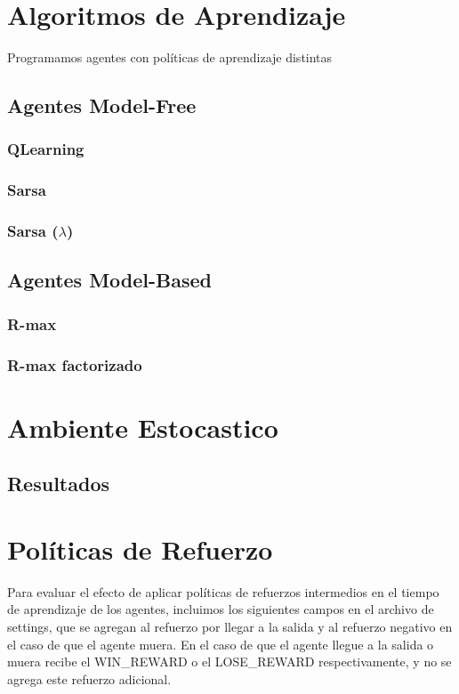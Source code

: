 \documentclass[a4paper,spanish] {article}
\begin{document}
\section{Algoritmos de Aprendizaje}
	Programamos agentes con pol\'iticas de aprendizaje distintas 
	\subsection{Agentes Model-Free}
		\subsubsection{QLearning}
		\subsubsection{Sarsa}
		\subsubsection{Sarsa ($\lambda$)}	
	\subsection{Agentes Model-Based}	
		\subsubsection{R-max}
		\subsubsection{R-max factorizado}

\section{Ambiente Estocastico}
	\subsection{Resultados}
	
 \section{Pol\'iticas de Refuerzo}
 	Para evaluar el efecto de aplicar pol\'iticas de refuerzos intermedios en el tiempo de aprendizaje de los agentes, incluimos los siguientes campos en el archivo de settings, que se agregan al refuerzo por llegar a la salida y al refuerzo negativo en el caso de que el agente muera. En el caso de que el agente llegue a la salida o muera recibe el WIN_REWARD o el LOSE_REWARD respectivamente, y no se agrega este refuerzo adicional.
\end{document}
